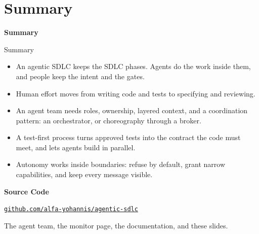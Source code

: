 \documentclass[aspectratio=169, table, 12pt]{beamer}
\begin{document}
\section{Summary}

\begin{frame}{\hfill}
  \centering
  \Huge{\textbf{Summary}}
\end{frame}

\begin{frame}{{\Large Summary}}
  \vspace{6pt}
  \begin{itemize}
    \item An agentic SDLC keeps the SDLC phases. Agents do the work inside
          them, and people keep the intent and the gates.
    \item Human effort moves from writing code and tests to specifying and
          reviewing.
    \item An agent team needs roles, ownership, layered context, and a
          coordination pattern: an orchestrator, or choreography through a
          broker.
    \item A test-first process turns approved tests into the contract the code
          must meet, and lets agents build in parallel.
    \item Autonomy works inside boundaries: refuse by default, grant narrow
          capabilities, and keep every message visible.
  \end{itemize}
\end{frame}

\begin{frame}{\hfill}
  \centering
  {\Large\textbf{Source Code}}

  \vspace{12pt}
  {\Large\href{https://github.com/alfa-yohannis/agentic-sdlc}{\texttt{github.com/alfa-yohannis/agentic-sdlc}}}

  \vspace{12pt}
  {\small The agent team, the monitor page, the documentation, and these
  slides.}
\end{frame}
\end{document}
